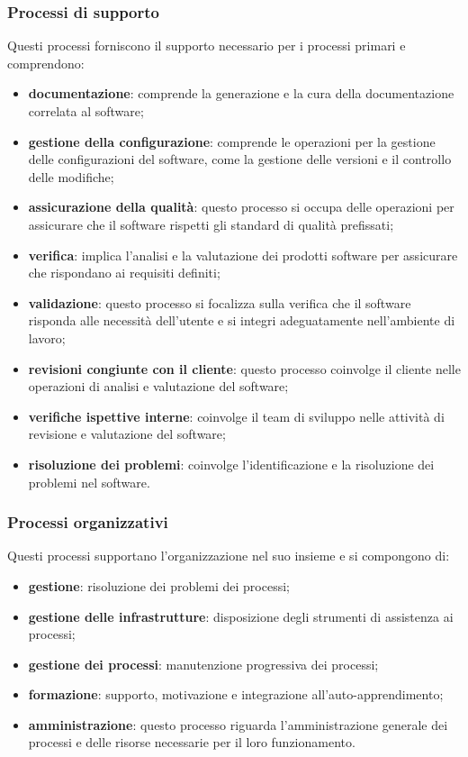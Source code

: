 \subsubsection{Processi di supporto}
Questi processi forniscono il supporto necessario per i processi primari e comprendono:
\begin{itemize}
    \item \textbf{documentazione}: comprende la generazione e la cura della documentazione correlata al software;
    \item \textbf{gestione della configurazione}: comprende le operazioni per la gestione delle configurazioni del software, come la gestione delle versioni e il controllo delle modifiche;
    \item \textbf{assicurazione della qualità}: questo processo si occupa delle operazioni per assicurare che il software rispetti gli standard di qualità prefissati;
    \item \textbf{verifica}: implica l’analisi e la valutazione dei prodotti software per assicurare che rispondano ai requisiti definiti;
    \item \textbf{validazione}: questo processo si focalizza sulla verifica che il software risponda alle necessità dell’utente e si integri adeguatamente nell’ambiente di lavoro;
    \item \textbf{revisioni congiunte con il cliente}: questo processo coinvolge il cliente nelle operazioni di analisi e valutazione del software;
    \item \textbf{verifiche ispettive interne}: coinvolge il team di sviluppo nelle attività di revisione e valutazione del software;
    \item \textbf{risoluzione dei problemi}: coinvolge l'identificazione e la risoluzione dei problemi nel software.
\end{itemize}
\subsubsection{Processi organizzativi}
Questi processi supportano l'organizzazione nel suo insieme e si compongono di:
\begin{itemize}
    \item \textbf{gestione}: risoluzione dei problemi dei processi;
    \item \textbf{gestione delle infrastrutture}: disposizione degli strumenti di assistenza ai processi;
    \item \textbf{gestione dei processi}: manutenzione progressiva dei processi;
    \item \textbf{formazione}: supporto, motivazione e integrazione all’auto-apprendimento;
    \item \textbf{amministrazione}: questo processo riguarda l'amministrazione generale dei processi e delle risorse necessarie per il loro funzionamento.
\end{itemize}